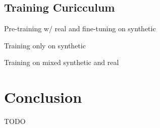 \documentclass{article}
\begin{document}
\subsection{Training Curicculum}
\label{sec:curicculum}

Pre-training w/ real and fine-tuning on synthetic

Training only on synthetic

Training on mixed synthetic and real

\section{Conclusion}
\label{sec:conclusion}

TODO



\end{document}
